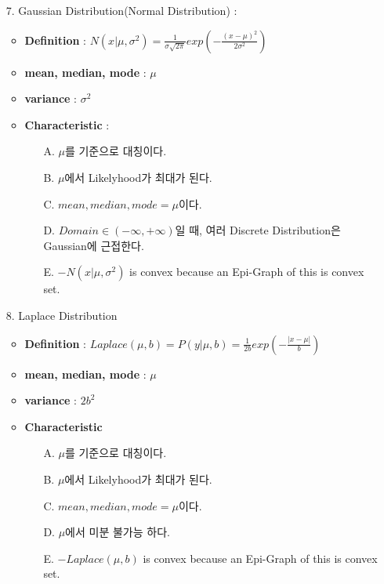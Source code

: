 \documentclass{article}
\begin{document}
\begin{itemize}
    \item[7.] Gaussian Distribution(Normal Distribution) : 
        \begin{itemize}
            \item \textbf{Definition} : $N(x|\mu, {\sigma}^2) = \frac{1}{\sigma\sqrt{2\pi}}exp(-\frac{(x-\mu)^2}{2{\sigma}^2})$
            \item \textbf{mean, median, mode} : $\mu$
            \item \textbf{variance} : ${\sigma}^2$
            \item \textbf{Characteristic} :
                \begin{itemize}
                    \item [A.] $\mu$를 기준으로 대칭이다.
                    \item [B.] $\mu$에서 Likelyhood가 최대가 된다.
                    \item [C.] $mean, median, mode = \mu$이다.
                    \item [D.] $Domain \in (-\infty, +\infty)$일 때, 여러 Discrete Distribution은 Gaussian에 근접한다.
                    \item [E.]  $-N(x|\mu, \sigma^2)$ is convex because an Epi-Graph of this is convex set.
                \end{itemize}
        \end{itemize}
    \item[8.] Laplace Distribution
        \begin{itemize}
            \item \textbf{Definition} : $Laplace(\mu,b) = P(y|\mu, b) = \frac{1}{2b}exp(-\frac{|x-\mu|}{b})$
            \item \textbf{mean, median, mode} : $\mu$
            \item \textbf{variance} : $2b^2$ 
            \item \textbf{Characteristic}
                \begin{itemize}
                    \item [A.] $\mu$를 기준으로 대칭이다.
                    \item [B.] $\mu$에서 Likelyhood가 최대가 된다.
                    \item [C.] $mean, median, mode = \mu$이다.
                    \item [D.] $\mu$에서 미분 불가능 하다.
                    \item [E.] $-Laplace(\mu, b)$ is convex because an Epi-Graph of this is convex set.
                \end{itemize}
        \end{itemize}
\end{itemize}
\end{document}
